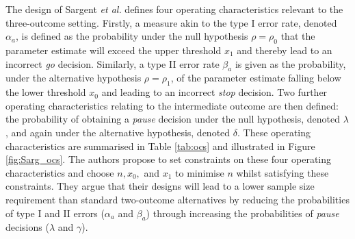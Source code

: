 \documentclass[referee, lineno, pdflatex,sn-vancouver,Numbered]{sn-jnl}%
\theoremstyle{thmstyleone}%
\theoremstyle{thmstyletwo}%
\theoremstyle{thmstylethree}%
\begin{document}
The design of Sargent \emph{et al.} defines four operating characteristics relevant to the three-outcome setting. Firstly, a measure akin to the type I error rate, denoted $\alpha_a$, is defined as the probability under the null hypothesis $\rho = \rho_0$ that the parameter estimate will exceed the upper threshold $x_1$ and thereby lead to an incorrect \emph{go} decision. Similarly, a type II error rate $\beta_a$ is given as the probability, under the alternative hypothesis $\rho = \rho_1$, of the parameter estimate falling below the lower threshold $x_0$ and leading to an incorrect \emph{stop} decision. Two further operating characteristics relating to the intermediate outcome are then defined: the probability of obtaining a \emph{pause} decision under the null hypothesis, denoted $\lambda$, and again under the alternative hypothesis, denoted $\delta$. These operating characteristics are summarised in Table \ref{tab:ocs} and illustrated in Figure \ref{fig:Sarg_ocs}. The authors propose to set constraints on these four operating characteristics and choose $n, x_0,$ and $x_1$ to minimise $n$ whilst satisfying these constraints. They argue that their designs will lead to a lower sample size requirement than standard two-outcome alternatives by reducing the probabilities of type I and II errors ($\alpha_a$ and $\beta_a$) through increasing the probabilities of \emph{pause} decisions ($\lambda$ and  $\gamma$).
\end{document}
